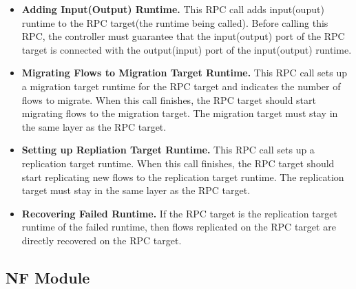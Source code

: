 \begin{itemize}


\item \textbf{Adding Input(Output) Runtime.} This RPC call adds input(ouput) runtime to the RPC target(the runtime being called). Before calling this RPC, the controller must guarantee that the input(output) port of the RPC target is connected with the output(input) port of the input(output) runtime.


\item \textbf{Migrating Flows to Migration Target Runtime.} This RPC call sets up a migration target runtime for the RPC target and indicates the number of flows to migrate. When this call finishes, the RPC target should start migrating flows to the migration target. The migration target must stay in the same layer as the RPC target.


\item \textbf{Setting up Repliation Target Runtime.} This RPC call sets up a replication target runtime. When this call finishes, the RPC target should start replicating new flows to the replication target runtime. The replication target must stay in the same layer as the RPC target.

\item \textbf{Recovering Failed Runtime.} If the RPC target is the replication target runtime of the failed runtime, then flows replicated on the RPC target are directly recovered on the RPC target.

\end{itemize}

\subsection{NF Module}

